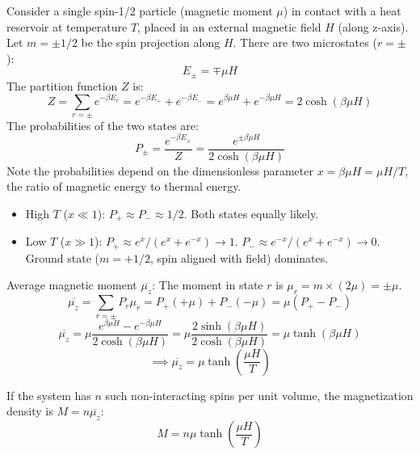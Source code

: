 \documentclass[11pt]{article}
\newcommand{\avg}[1]{\overline{#1}}
\newcommand{\partfn}{Z} %
\begin{document}
Consider a single spin-1/2 particle (magnetic moment $\mu$) in contact with a heat reservoir at temperature $T$, placed in an external magnetic field $H$ (along z-axis).
Let $m = \pm 1/2$ be the spin projection along $H$.
There are two microstates ($r=\pm$):
\[ E_\pm = \mp \mu H \]
The partition function $Z$ is:
\[ \partfn = \sum_{r=\pm} e^{-\beta E_r} = e^{-\beta E_+} + e^{-\beta E_-} = e^{\beta \mu H} + e^{-\beta \mu H} = 2 \cosh(\beta \mu H) \]
The probabilities of the two states are:
\[ P_\pm = \frac{e^{-\beta E_\pm}}{\partfn} = \frac{e^{\pm \beta \mu H}}{2 \cosh(\beta \mu H)} \]
Note the probabilities depend on the dimensionless parameter $x = \beta \mu H = \mu H / T$, the ratio of magnetic energy to thermal energy.
\begin{itemize}
    \item High $T$ ($x \ll 1$): $P_+ \approx P_- \approx 1/2$. Both states equally likely.
    \item Low $T$ ($x \gg 1$): $P_+ \approx e^x / (e^x+e^{-x}) \to 1$. $P_- \approx e^{-x} / (e^x+e^{-x}) \to 0$. Ground state ($m=+1/2$, spin aligned with field) dominates.
\end{itemize}

Average magnetic moment $\avg{\mu_z}$:
The moment in state $r$ is $\mu_r = m \times (2\mu) = \pm \mu$. %
\[ \avg{\mu_z} = \sum_{r=\pm} P_r \mu_r = P_+ (+\mu) + P_- (-\mu) = \mu (P_+ - P_-) \]
\[ \avg{\mu_z} = \mu \frac{e^{\beta \mu H} - e^{-\beta \mu H}}{2 \cosh(\beta \mu H)} = \mu \frac{2 \sinh(\beta \mu H)}{2 \cosh(\beta \mu H)} = \mu \tanh(\beta \mu H) \]
\[ \implies \avg{\mu_z} = \mu \tanh\left(\frac{\mu H}{T}\right) \]

If the system has $n$ such non-interacting spins per unit volume, the magnetization density is $M = n \avg{\mu_z}$:
\[ M = n \mu \tanh\left(\frac{\mu H}{T}\right) \]

\begin{center}
\end{center}
\end{document}
